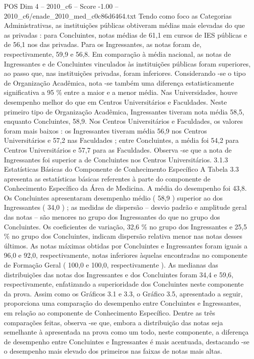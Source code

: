 \begin{textsample}{POS Dim 4 – 2010\_c6 – Score -1.00 – 2010\_c6/enade\_2010\_med\_c0c86d6464.txt}
Tendo como foco as Categorias Administrativas, as instituições públicas obtiveram médias mais elevadas do que as privadas : para Concluintes, notas médias de 61,1 em cursos de IES públicas e de 56,1 nos das privadas.
Para os Ingressantes, as notas foram de, respectivamente, 59,9 e 56,8.
Em comparação à média nacional, as notas de Ingressantes e de Concluintes vinculados às instituições públicas foram superiores, ao passo que, nas instituições privadas, foram inferiores.
Considerando -se o tipo de Organização Acadêmica, nota -se também uma diferença estatisticamente significativa a 95 \% entre a maior e a menor média.
Nas Universidades, houve desempenho melhor do que em Centros Universitários e Faculdades.
Neste primeiro tipo de Organização Acadêmica, Ingressantes tiveram nota média 58,5, enquanto Concluintes, 58,9.
Nos Centros Universitários e Faculdades, os valores foram mais baixos : os Ingressantes tiveram média 56,9 nos Centros Universitários e 57,2 nas Faculdades ; entre Concluintes, a média foi 54,2 para Centros Universitários e 57,7 para as Faculdades.
Observa -se que a nota de Ingressantes foi superior a de Concluintes nos Centros Universitários. 3.1.3 Estatísticas Básicas do Componente de Conhecimento Específico A Tabela 3.3 apresenta as estatísticas básicas referentes à parte do componente de Conhecimento Específico da Área de Medicina.
A média do desempenho foi 43,8.
Os Concluintes apresentaram desempenho médio ( 58,9 ) superior ao dos Ingressantes ( 34,0 ) ; as medidas de dispersão – desvio padrão e amplitude geral das notas – são menores no grupo dos Ingressantes do que no grupo dos Concluintes.
Os coeficientes de variação, 32,6 \% no grupo dos Ingressantes e 25,5 \% no grupo dos Concluintes, indicam dispersão relativa menor nas notas desses últimos.
As notas máximas obtidas por Concluintes e Ingressantes foram iguais a 96,0 e 92,0, respectivamente, notas inferiores àquelas encontradas no componente de Formação Geral ( 100,0 e 100,0, respectivamente ).
As medianas das distribuições das notas dos Ingressantes e dos Concluintes foram 34,4 e 59,6, respectivamente, enfatizando a superioridade dos Concluintes neste componente da prova.
Assim como os Gráficos 3.1 e 3.3, o Gráfico 3.5, apresentado a seguir, proporciona uma comparação do desempenho entre Concluintes e Ingressantes, em relação ao componente de Conhecimento Específico.
Dentre as três comparações feitas, observa -se que, embora a distribuição das notas seja semelhante à apresentada na prova como um todo, neste componente, a diferença de desempenho entre Concluintes e Ingressantes é mais acentuada, destacando -se o desempenho mais elevado dos primeiros nas faixas de notas mais altas.

\end{textsample}
